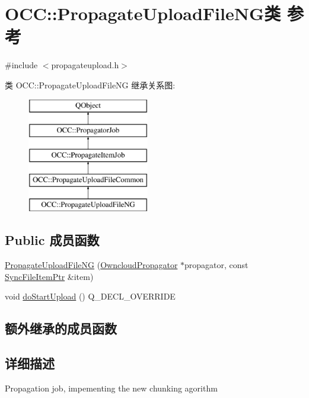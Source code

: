 \hypertarget{class_o_c_c_1_1_propagate_upload_file_n_g}{}\section{O\+CC\+:\+:Propagate\+Upload\+File\+N\+G类 参考}
\label{class_o_c_c_1_1_propagate_upload_file_n_g}


{\ttfamily \#include $<$propagateupload.\+h$>$}

类 O\+CC\+:\+:Propagate\+Upload\+File\+NG 继承关系图\+:\begin{figure}[H]
\begin{center}
\leavevmode
\includegraphics[height=5.000000cm]{class_o_c_c_1_1_propagate_upload_file_n_g}
\end{center}
\end{figure}
\subsection*{Public 成员函数}
\begin{DoxyCompactItemize}
\item 
\hyperlink{class_o_c_c_1_1_propagate_upload_file_n_g_ad9a38eb12273166c9da41f6cdc0635e4}{Propagate\+Upload\+File\+NG} (\hyperlink{class_o_c_c_1_1_owncloud_propagator}{Owncloud\+Propagator} $\ast$propagator, const \hyperlink{namespace_o_c_c_acb6b0db82893659fbd0c98d3c5b8e2b8}{Sync\+File\+Item\+Ptr} \&item)
\item 
void \hyperlink{class_o_c_c_1_1_propagate_upload_file_n_g_ae601085b44092a20f669a91dadb13e8d}{do\+Start\+Upload} () Q\+\_\+\+D\+E\+C\+L\+\_\+\+O\+V\+E\+R\+R\+I\+DE
\end{DoxyCompactItemize}
\subsection*{额外继承的成员函数}


\subsection{详细描述}
Propagation job, impementing the new chunking agorithm 

